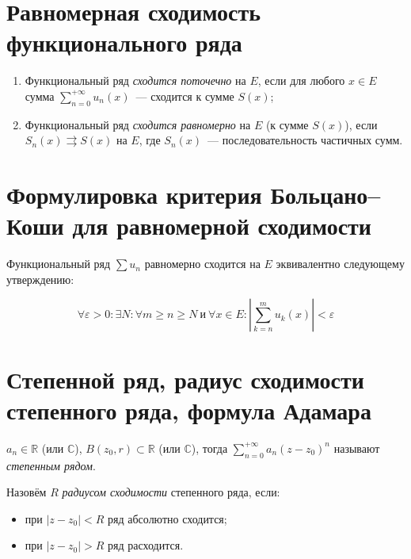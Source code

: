 \documentclass{article}
\begin{document}
    \newpage
    
    \section{Равномерная сходимость функционального ряда}
    
        \begin{enumerate}
        
            \item Функциональный ряд \textit{сходится поточечно} на $E$, если для любого $x \in E$ сумма $\sum\limits^{+\infty}_{n = 0} u_n(x)$~--- сходится к сумме $S(x)$;
            
            \item Функциональный ряд \textit{сходится равномерно} на $E$ (к сумме $S(x)$), если $S_n(x) \rightrightarrows S(x)$ на $E$, где $S_n(x)$~--- последовательность частичных сумм.
            
        \end{enumerate}
        
    \newpage
    
    \section{Формулировка критерия Больцано--Коши для равномерной сходимости}
    
        Функциональный ряд $\sum u_n$ равномерно сходится на $E$ эквивалентно следующему утверждению:
        
        $$\forall \varepsilon > 0 : \exists N : \forall m \geqslant n \geqslant N \ \textrm{и} \ \forall x \in E : \left| \sum\limits^m_{k = n} u_k(x) \right| < \varepsilon$$
        
    \newpage
    
    \section{Степенной ряд, радиус сходимости степенного ряда, формула Адамара}
    
        $a_n \in \mathbb{R}$ (или $\mathbb{C}$), $B(z_0, r) \subset \mathbb{R}$ (или $\mathbb{C}$), тогда $\sum\limits^{+\infty}_{n = 0} a_n (z - z_0)^n$ называют \textit{степенным рядом}.
        
        Назовём $R$ \textit{радиусом сходимости} степенного ряда, если:
        
            \begin{itemize}
            
                \item при $|z - z_0| < R$ ряд абсолютно сходится;
                
                \item при $|z - z_0| > R$ ряд расходится.
                
            \end{itemize}
        
\end{document}
